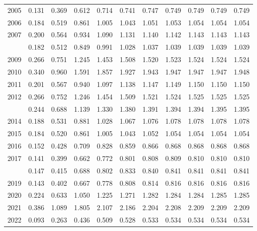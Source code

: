 \documentclass[
]{article}
\begin{document}
\begin{longtable}[t]{lrrrrrrrrrr}
2005 & 0.131 & 0.369 & 0.612 & 0.714 & 0.741 & 0.747 & 0.749 & 0.749 & 0.749 & 0.749\\
2006 & 0.184 & 0.519 & 0.861 & 1.005 & 1.043 & 1.051 & 1.053 & 1.054 & 1.054 & 1.054\\
2007 & 0.200 & 0.564 & 0.934 & 1.090 & 1.131 & 1.140 & 1.142 & 1.143 & 1.143 & 1.143\\
\addlinespace
2008 & 0.182 & 0.512 & 0.849 & 0.991 & 1.028 & 1.037 & 1.039 & 1.039 & 1.039 & 1.039\\
2009 & 0.266 & 0.751 & 1.245 & 1.453 & 1.508 & 1.520 & 1.523 & 1.524 & 1.524 & 1.524\\
2010 & 0.340 & 0.960 & 1.591 & 1.857 & 1.927 & 1.943 & 1.947 & 1.947 & 1.947 & 1.948\\
2011 & 0.201 & 0.567 & 0.940 & 1.097 & 1.138 & 1.147 & 1.149 & 1.150 & 1.150 & 1.150\\
2012 & 0.266 & 0.752 & 1.246 & 1.454 & 1.509 & 1.521 & 1.524 & 1.525 & 1.525 & 1.525\\
\addlinespace
2013 & 0.244 & 0.688 & 1.139 & 1.330 & 1.380 & 1.391 & 1.394 & 1.394 & 1.395 & 1.395\\
2014 & 0.188 & 0.531 & 0.881 & 1.028 & 1.067 & 1.076 & 1.078 & 1.078 & 1.078 & 1.078\\
2015 & 0.184 & 0.520 & 0.861 & 1.005 & 1.043 & 1.052 & 1.054 & 1.054 & 1.054 & 1.054\\
2016 & 0.152 & 0.428 & 0.709 & 0.828 & 0.859 & 0.866 & 0.868 & 0.868 & 0.868 & 0.868\\
2017 & 0.141 & 0.399 & 0.662 & 0.772 & 0.801 & 0.808 & 0.809 & 0.810 & 0.810 & 0.810\\
\addlinespace
2018 & 0.147 & 0.415 & 0.688 & 0.802 & 0.833 & 0.840 & 0.841 & 0.841 & 0.841 & 0.841\\
2019 & 0.143 & 0.402 & 0.667 & 0.778 & 0.808 & 0.814 & 0.816 & 0.816 & 0.816 & 0.816\\
2020 & 0.224 & 0.633 & 1.050 & 1.225 & 1.271 & 1.282 & 1.284 & 1.284 & 1.285 & 1.285\\
2021 & 0.386 & 1.089 & 1.805 & 2.107 & 2.186 & 2.204 & 2.208 & 2.209 & 2.209 & 2.209\\
2022 & 0.093 & 0.263 & 0.436 & 0.509 & 0.528 & 0.533 & 0.534 & 0.534 & 0.534 & 0.534\\*
\end{longtable}
\end{document}
